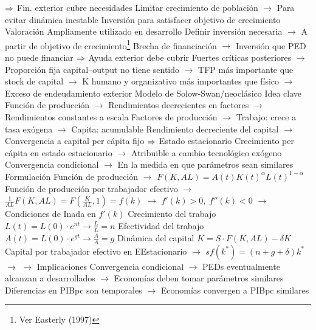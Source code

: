 \documentclass{nuevotema}
\begin{document}
\begin{esquemal}
				\4[] $\Rightarrow$ Fin. exterior cubre necesidades
				\4[] Limitar crecimiento de población
				\4[] $\to$ Para evitar dinámica inestable
				\4[] Inversión para satisfacer objetivo de crecimiento
				\4 Valoración
				\4[] Ampliamente utilizado en desarrollo
				\4[] Definir inversión necesaria
				\4[] $\to$ A partir de objetivo de crecimiento\footnote{Ver Easterly (1997)}
				\4[] Brecha de financiación
				\4[] $\to$ Inversión que PED no puede financiar
				\4[] $\Rightarrow$ Ayuda exterior debe cubrir
				\4[] Fuertes críticas posteriores
				\4[] $\to$ Proporción fija capital--output no tiene sentido
				\4[] $\to$ TFP más importante que stock de capital
				\4[] $\to$ K humano y organizativo más importantes que físico
				\4[] $\to$ Exceso de endeudamiento exterior
			\3 Modelo de Solow-Swan/neoclásico
				\4 Idea clave
				\4[] Función de producción
				\4[] $\to$ Rendimientos decrecientes en factores
				\4[] $\to$ Rendimientos constantes a escala
				\4[] Factores de producción
				\4[] $\to$ Trabajo: crece a tasa exógena
				\4[] $\to$ Capita: acumulable
				\4[] Rendimiento decreciente del capital
				\4[] $\to$ Convergencia a capital per cápita fijo
				\4[] $\Rightarrow$ Estado estacionario
				\4[] Crecimiento per cápita en estado estacionario
				\4[] $\to$ Atribuible a cambio tecnológico exógeno
				\4[] Convergencia condicional
				\4[] $\to$ En la medida en que parámetros sean similares
				\4 Formulación
				\4[] Función de producción
				\4[] $\to$ $F(K,AL) = A(t) K(t)^\alpha L(t)^{1-\alpha}$
				\4[] Función de producción por trabajador efectivo
				\4[] $\to$ $\frac{1}{AL}F(K, AL) = F(\frac{K}{AL},1) = f(k)$
				\4[] $\to$ $f'(k) > 0, \; f''(k)<0$
				\4[] $\to$ Condiciones de Inada en $f'(k)$
				\4[] Crecimiento del trabajo
				\4[] $L(t) = L(0)\cdot e^{nt} \rightarrow \frac{\dot{L}}{L} = n$
				\4[] Efectividad del trabajo
				\4[] $A(t) = L(0)\cdot e^{gt} \rightarrow \frac{\dot{A}}{A} = g$
				\4[] Dinámica del capital
				\4[] $\dot{K} = S\cdot F(K, AL) - \delta K$
				\4[] 
				\4[] Capital por trabajador efectivo en EEstacionario
				\4[] $\to$ $sf(k^*) = (n+g+\delta)k^*$
				\4[] $\to$ 
				\4[] $\to$ 
				\4 Implicaciones
				\4[] Convergencia condicional
				\4[] $\to$ PEDs eventualmente alcanzan a desarrollados
				\4[] $\to$ Economías deben tomar parámetros similares
				\4[] Diferencias en PIBpc son temporales
				\4[] $\to$ Economías convergen a PIBpc similares

\end{esquemal}
\end{document}
